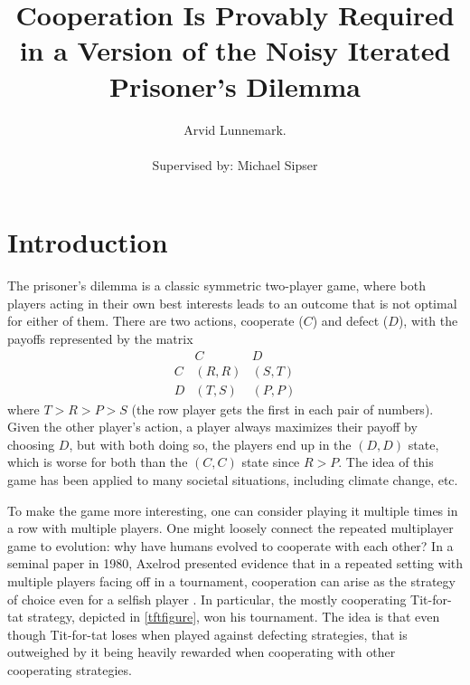 \documentclass[11pt]{amsart}
\title{Cooperation Is Provably Required in a Version of the Noisy Iterated Prisoner's Dilemma}
\author{Arvid Lunnemark. \\ \\
Supervised by: Michael Sipser}
\theoremstyle{definition}
\theoremstyle{remark}
\begin{document}
\maketitle

\section{Introduction}

The prisoner's dilemma is a classic symmetric two-player game, where both players acting in their own best interests leads to an outcome that is not optimal for either of them. There are two actions, cooperate ($C$) and defect ($D$), with the payoffs represented by the matrix
\begin{equation*}
  \begin{matrix}
      &  C & D \\ 
    C &  (R, R) & (S, T) \\
    D & (T, S) & (P, P)
  \end{matrix}
\end{equation*}
where $T > R > P > S$ (the row player gets the first in each pair of numbers). Given the other player's action, a player always maximizes their payoff by choosing $D$, but with both doing so, the players end up in the $(D, D)$ state, which is worse for both than the $(C, C)$ state since $R > P$. The idea of this game has been applied to many societal situations, including climate change, etc.

To make the game more interesting, one can consider playing it multiple times in a row with multiple players. One might loosely connect the repeated multiplayer game to evolution: why have humans evolved to cooperate with each other? In a seminal paper in 1980, Axelrod presented evidence that in a repeated setting with multiple players facing off in a tournament, cooperation can arise as the strategy of choice even for a selfish player \cite{axelrod1980effective}. In particular, the mostly cooperating Tit-for-tat strategy, depicted in \cref{tftfigure}, won his tournament. The idea is that even though Tit-for-tat loses when played against defecting strategies, that is outweighed by it being heavily rewarded when cooperating with other cooperating strategies.
\end{document}
